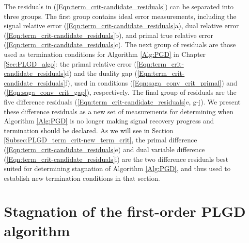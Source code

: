 \begin{enumerate}
The residuals in (\ref{Eqn:term_crit-candidate_residuals}) can be separated into three groups.   
The first group contains ideal error measurements, including the signal relative error (\ref{Eqn:term_crit-candidate_residuals}a), dual relative error (\ref{Eqn:term_crit-candidate_residuals}b), and primal true relative error (\ref{Eqn:term_crit-candidate_residuals}c).
The next group of residuals are those used as termination conditions for Algorithm \ref{Alg:PGD} in Chapter \ref{Sec:PLGD_algo}: the primal relative error (\ref{Eqn:term_crit-candidate_residuals}d) and the duality gap (\ref{Eqn:term_crit-candidate_residuals}f), used in conditions (\ref{Eqn:saga_conv_crit_primal}) and (\ref{Eqn:saga_conv_crit_gap}), respectively.
The final group of residuals are the five difference residuals (\ref{Eqn:term_crit-candidate_residuals}e, g-j).
We present these difference residuals as a new set of measurements for determining when Algorithm \ref{Alg:PGD} is no longer making signal recovery progress and termination should be declared.
As we will see in Section \ref{Subsec:PLGD_term_crit-new_term_crit}, the primal difference (\ref{Eqn:term_crit-candidate_residuals}e) and dual variable difference (\ref{Eqn:term_crit-candidate_residuals}i) are the two difference residuals best suited for determining stagnation of Algorithm \ref{Alg:PGD}, and thus used to establish new termination conditions in that section.




\end{enumerate}








\section{Stagnation of the first-order PLGD algorithm} 		\label{Subsec:PLGD_term_crit-stagnation}


